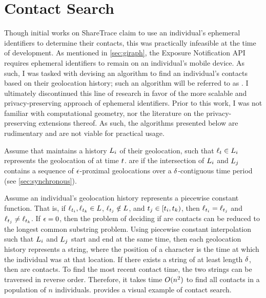 \section{Contact Search}\label{sec:contact-search}

Though initial works on ShareTrace \citep{Ayday2020,Ayday2021} claim to use an individual's ephemeral identifiers to determine their contacts, this was practically infeasible at the time of development. As mentioned in \cref{sec:giraph}, the Exposure Notification API requires ephemeral identifiers to remain on an individual's mobile device. As such, I was tasked with devising an algorithm to find an individual's contacts based on their geolocation history; such an algorithm will be referred to as . I ultimately discontinued this line of research in favor of the more scalable and privacy-preserving approach of ephemeral identifiers. Prior to this work, I was not familiar with computational geometry, nor the literature on the privacy-preserving extensions thereof. As such, the algorithms presented below are rudimentary and are not viable for practical usage.

Assume that  maintains a history $L_i$ of their geolocation, such that $\ell_t \in L_i$ represents the geolocation of  at time $t$.  are  if the intersection of $L_i$ and $L_j$ contains a sequence of $\epsilon$-proximal geolocations over a $\delta$-contiguous time period (see \cref{sec:synchronous}). 

Assume an individual's geolocation history represents a piecewise constant function. That is, if $\ell_{t_i}, \ell_{t_k} \in L$, $\ell_{t_j} \notin L$, and $t_j \in [t_i, t_k)$, then $\ell_{t_i} = \ell_{t_j}$ and $\ell_{t_j} \neq \ell_{t_k}$. If $\epsilon = 0$, then the problem of deciding if  are contacts can be reduced to the longest common substring problem. Using piecewise constant interpolation such that $L_i$ and $L_j$ start and end at the same time, then each geolocation history represents a string, where the position of a character is the time at which the individual was at that location. If there exists a string of at least length $\delta$, then  are contacts. To find the most recent contact time, the two strings can be traversed in reverse order. Therefore, it takes time $O(n^2)$ to find all contacts in a population of $n$ individuals.  provides a visual example of contact search.

